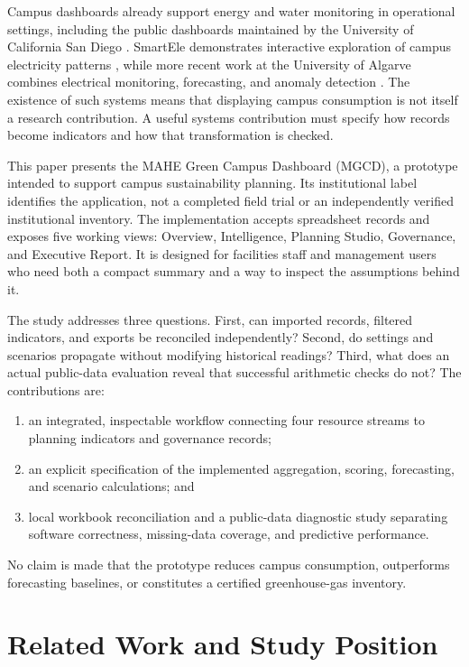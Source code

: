 \documentclass[conference]{IEEEtran}
\begin{document}
Campus dashboards already support energy and water monitoring in operational settings, including the public dashboards maintained by the University of California San Diego \cite{ucsd}. SmartEle demonstrates interactive exploration of campus electricity patterns \cite{smartele}, while more recent work at the University of Algarve combines electrical monitoring, forecasting, and anomaly detection \cite{sousa}. The existence of such systems means that displaying campus consumption is not itself a research contribution. A useful systems contribution must specify how records become indicators and how that transformation is checked.

This paper presents the MAHE Green Campus Dashboard (MGCD), a prototype intended to support campus sustainability planning. Its institutional label identifies the application, not a completed field trial or an independently verified institutional inventory. The implementation accepts spreadsheet records and exposes five working views: Overview, Intelligence, Planning Studio, Governance, and Executive Report. It is designed for facilities staff and management users who need both a compact summary and a way to inspect the assumptions behind it.

The study addresses three questions. First, can imported records, filtered indicators, and exports be reconciled independently? Second, do settings and scenarios propagate without modifying historical readings? Third, what does an actual public-data evaluation reveal that successful arithmetic checks do not? The contributions are:
\begin{enumerate}
\item an integrated, inspectable workflow connecting four resource streams to planning indicators and governance records;
\item an explicit specification of the implemented aggregation, scoring, forecasting, and scenario calculations; and
\item local workbook reconciliation and a public-data diagnostic study separating software correctness, missing-data coverage, and predictive performance.
\end{enumerate}
No claim is made that the prototype reduces campus consumption, outperforms forecasting baselines, or constitutes a certified greenhouse-gas inventory.

\section{Related Work and Study Position}
\end{document}
